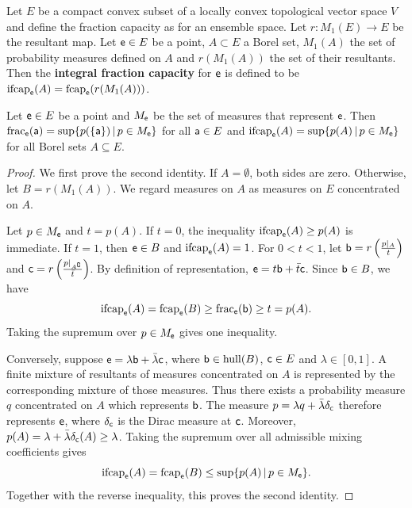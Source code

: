 \begin{mathSection}
\begin{defn}
	Let $E$ be a compact convex subset of a locally convex topological vector space $V$ and define the fraction capacity as for an ensemble space. Let $r : M_1(E) \to E$ be the resultant map. Let $\ens \in E$ be a point, $A \subset E$ a Borel set, $M_1(A)$ the set of probability measures defined on $A$ and $r(M_1(A))$ the set of their resultants. Then the \textbf{integral fraction capacity} for $\ens$ is defined to be $\mathrm{ifcap}_{\ens}(A) = \fcap_{\ens}(r(M_1(A)))$.
\end{defn}
	
\begin{prop}\label{pm-es-fractionSupChoquet}
	  Let $\ens \in E$ be a point and $M_{\ens}$ be the set of measures that represent $\ens$. Then $\fraction_{\ens}(\ens[a]) = \sup \{ p(\{\ens[a]\}) \, | \, p \in M_{\ens} \}$  for all $\ens[a] \in E$ and $\mathrm{ifcap}_{\ens}(A) = \sup \{ p(A) \, | \, p \in M_{\ens} \}$ for all Borel sets $A \subseteq E$.
\end{prop}

\begin{proof}
	We first prove the second identity. If $A=\emptyset$, both sides are zero. Otherwise, let $B=r(M_1(A))$. We regard measures on $A$ as measures on $E$ concentrated on $A$.
	
	Let $p \in M_{\ens}$ and $t=p(A)$. If $t=0$, the inequality $\mathrm{ifcap}_{\ens}(A) \geq p(A)$ is immediate. If $t=1$, then $\ens \in B$ and $\mathrm{ifcap}_{\ens}(A)=1$. For $0<t<1$, let $\ens[b] = r\left(\frac{p|_A}{t}\right)$ and $	\ens[c] = r\left(\frac{p|_{A^{\complement}}}{\bar{t}}\right)$.
	By definition of representation, $\ens = t\ens[b] + \bar{t}\ens[c]$. Since $\ens[b] \in B$, we have
	\begin{equation}
		\mathrm{ifcap}_{\ens}(A)
		= \fcap_{\ens}(B)
		\geq \fraction_{\ens}(\ens[b])
		\geq t = p(A).
	\end{equation}
	Taking the supremum over $p \in M_{\ens}$ gives one inequality.
	
	Conversely, suppose $\ens = \lambda\ens[b] + \bar{\lambda}\ens[c]$, where $\ens[b] \in \hull(B)$, $\ens[c] \in E$ and $\lambda \in [0,1]$. A finite mixture of resultants of measures concentrated on $A$ is represented by the corresponding mixture of those measures. Thus there exists a probability measure $q$ concentrated on $A$ which represents $\ens[b]$.	The measure $p=\lambda q+\bar{\lambda}\delta_{\ens[c]}$ therefore represents $\ens$, where $\delta_{\ens[c]}$ is the Dirac measure at $\ens[c]$. Moreover, $p(A) = \lambda+\bar{\lambda}\delta_{\ens[c]}(A) \geq \lambda$. Taking the supremum over all admissible mixing coefficients gives
	\begin{equation}
		\mathrm{ifcap}_{\ens}(A)
		= \fcap_{\ens}(B)
		\leq \sup \{p(A) \, | \, p \in M_{\ens}\}.
	\end{equation}
	Together with the reverse inequality, this proves the second identity.
	

\end{proof}
\end{mathSection}
